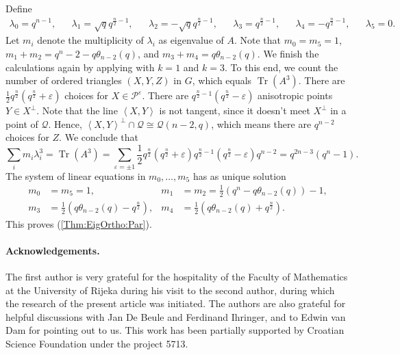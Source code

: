 \documentclass[a4paper]{article}
\theoremstyle{definition}
\newcommand{\eps}{\varepsilon}
\newcommand{\vspan}[1]{\left \langle #1 \right \rangle}
\newcommand{\pp}{\mathcal P}
\newcommand{\mq}{\mathcal Q}
\DeclareMathOperator{\Tr}{Tr}
\begin{document}
Define
\begin{align*}
 \lambda_0 = q^{n-1}, &&
 \lambda_1 = \sqrt q q^{\frac n2 - 1}, &&
 \lambda_2 = -\sqrt q q^{\frac n2 - 1}, &&
 \lambda_3 = q^{\frac n2 - 1}, &&
 \lambda_4 = -q^{\frac n2 - 1}, &&
 \lambda_5 = 0.
\end{align*}
Let $m_i$ denote the multiplicity of $\lambda_i$ as eigenvalue of $A$.
Note that $m_0 = m_5 = 1$, $m_1+m_2 = q^n-2-q\theta_{n-2}(q)$, and $m_3+m_4 = q\theta_{n-2}(q)$.
We finish the calculations again by applying  with $k=1$ and $k=3$.
To this end, we count the number of ordered triangles $(X,Y,Z)$ in $G$, which equals $\Tr(A^3)$.
There are $\frac 12 q^\frac n2 \left( q^\frac n 2 + \eps\right)$ choices for $X \in \pp^\eps$.
There are $q^{\frac n2 - 1} \left( q^\frac n2 - \eps \right)$ anisotropic points $Y \in X^\perp$.
Note that the line $\vspan{X,Y}$ is not tangent, since it doesn't meet $X^\perp$ in a point of $\mq$.
Hence, $\vspan{X,Y}^\perp \cap \mq \cong \mq(n-2,q)$, which means there are $q^{n-2}$ choices for $Z$.
We conclude that
\[
 \sum_i m_i \lambda_i^3 = \Tr(A^3)
 = \sum_{\eps = \pm 1} \frac 12 q^\frac n2 \left( q^\frac n2 + \eps \right) q^{\frac n2 - 1} \left( q^\frac n2 - \eps \right) q^{n-2}
 = q^{2n-3} (q^n-1).
\]
The system of linear equations in $m_0,\dots,m_5$ has as unique solution
\begin{align*}
 m_0 &= m_5 = 1, &
 m_1 &= m_2 = \frac 1 2 \left( q^n - q \theta_{n-2}(q) \right) - 1, \\
 m_3 &= \frac 12 \left( q \theta_{n-2}(q) - q^\frac n2 \right), &
 m_4 &= \frac 12 \left( q \theta_{n-2}(q) + q^\frac n2 \right).
\end{align*}
This proves  (\ref{Thm:EigOrtho:Par}).

\paragraph{Acknowledgements.}
The first author is very grateful for the hospitality of the Faculty of Mathematics at the University of Rijeka during his visit to the second author, during which the research of the present article was initiated. The authors are also grateful for helpful discussions with Jan De Beule and Ferdinand Ihringer, and to Edwin van Dam for pointing out \cite{FisherPenttilaPraegerRoyle} to us.
This work has been partially supported by Croatian Science Foundation under the project 5713.
\end{document}
